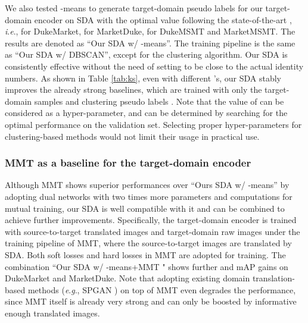 \documentclass[journal]{IEEEtran}
\newcommand{\ie}{\textit{i}.\textit{e}., }
\newcommand{\eg}{\textit{e}.\textit{g}., }
\begin{document}
We also tested -means to generate target-domain pseudo labels for our target-domain encoder on SDA with the optimal  value following the state-of-the-art \cite{ge2020mutual}, \ie
 for DukeMarket,  for MarketDuke,  for DukeMSMT and MarketMSMT.
The results are denoted as ``Our SDA w/ {-means}''.
The training pipeline is the same as ``Our SDA w/ {DBSCAN}'', except for the clustering algorithm.
Our SDA is consistently effective without the need of setting  to be close to the actual identity numbers.
As shown in Table \ref{tab:ks}, even with different 's, our SDA stably improves the already strong {baselines}, which are trained with only the target-domain samples and clustering pseudo labels \cite{song2018unsupervised}.
 {Note that the value of  can be considered as a hyper-parameter, and can be determined by searching for the optimal performance on the validation set. Selecting proper hyper-parameters for clustering-based methods would not limit their usage in practical use.}


\subsubsection{\textbf{MMT \cite{ge2020mutual} as a baseline for the target-domain encoder}}

Although MMT \cite{ge2020mutual} shows superior performances over ``Ours SDA w/ -means'' by adopting dual networks with two times more parameters and computations for mutual training,
our SDA is well compatible with it and can be combined to achieve further improvements.
Specifically, the target-domain encoder is trained with source-to-target translated images and target-domain raw images under the training pipeline of MMT, where the source-to-target images are translated by SDA.
Both soft losses and hard losses in MMT are adopted for training.
The combination ``Our SDA w/ -means+MMT \cite{ge2020mutual}" shows further  and  mAP gains on DukeMarket and MarketDuke.
 {Note that adopting existing domain translation-based methods (\eg SPGAN \cite{deng2018image}) on top of MMT \cite{ge2020mutual} even degrades the performance, since MMT \cite{ge2020mutual} itself is already very strong and can only be boosted by informative enough translated images.}
\end{document}
